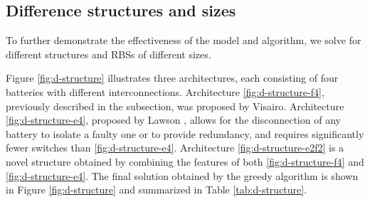 \documentclass{article}
\begin{document}
\subsection{Difference structures and sizes}

To further demonstrate the effectiveness of the model and algorithm, we solve for different structures and RBSs of different sizes.


Figure \ref{fig:d-structure} illustrates three architectures, each consisting of four batteries with different interconnections.
Architecture \ref{fig:d-structure-f4}, previously described in the subsection, was proposed by Visairo\cite{visairoReconfigurableBatteryPack2008}.
Architecture \ref{fig:d-structure-e4}, proposed by Lawson \cite{lawsonSoftwareConfigurableBattery2012}, allows for the disconnection of any battery to isolate a faulty one or to provide redundancy, and requires significantly fewer switches than \ref{fig:d-structure-e4}.
Architecture \ref{fig:d-structure-e2f2} is a novel structure obtained by combining the features of both \ref{fig:d-structure-f4} and \ref{fig:d-structure-e4}.
The final solution obtained by the greedy algorithm is shown in Figure \ref{fig:d-structure} and summarized in Table \ref{tab:d-structure}.
\end{document}
